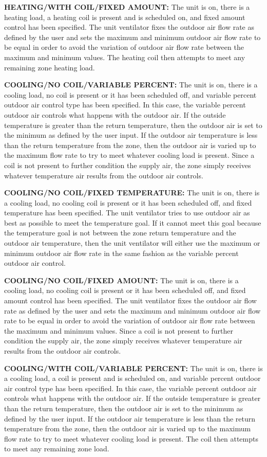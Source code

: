 \textbf{HEATING/WITH COIL/FIXED AMOUNT:} The unit is on, there is a heating load, a heating coil is present and is scheduled on, and fixed amount control has been specified. The unit ventilator fixes the outdoor air flow rate as defined by the user and sets the maximum and minimum outdoor air flow rate to be equal in order to avoid the variation of outdoor air flow rate between the maximum and minimum values. The heating coil then attempts to meet any remaining zone heating load.

\textbf{COOLING/NO COIL/VARIABLE PERCENT:} The unit is on, there is a cooling load, no coil is present or it has been scheduled off, and variable percent outdoor air control type has been specified. In this case, the variable percent outdoor air controls what happens with the outdoor air. If the outside temperature is greater than the return temperature, then the outdoor air is set to the minimum as defined by the user input. If the outdoor air temperature is less than the return temperature from the zone, then the outdoor air is varied up to the maximum flow rate to try to meet whatever cooling load is present. Since a coil is not present to further condition the supply air, the zone simply receives whatever temperature air results from the outdoor air controls.

\textbf{COOLING/NO COIL/FIXED TEMPERATURE:} The unit is on, there is a cooling load, no cooling coil is present or it has been scheduled off, and fixed temperature has been specified. The unit ventilator tries to use outdoor air as best as possible to meet the temperature goal. If it cannot meet this goal because the temperature goal is not between the zone return temperature and the outdoor air temperature, then the unit ventilator will either use the maximum or minimum outdoor air flow rate in the same fashion as the variable percent outdoor air control.

\textbf{COOLING/NO COIL/FIXED AMOUNT:} The unit is on, there is a cooling load, no cooling coil is present or it has been scheduled off, and fixed amount control has been specified. The unit ventilator fixes the outdoor air flow rate as defined by the user and sets the maximum and minimum outdoor air flow rate to be equal in order to avoid the variation of outdoor air flow rate between the maximum and minimum values. Since a coil is not present to further condition the supply air, the zone simply receives whatever temperature air results from the outdoor air controls.

\textbf{COOLING/WITH COIL/VARIABLE PERCENT:} The unit is on, there is a cooling load, a coil is present and is scheduled on, and variable percent outdoor air control type has been specified. In this case, the variable percent outdoor air controls what happens with the outdoor air. If the outside temperature is greater than the return temperature, then the outdoor air is set to the minimum as defined by the user input. If the outdoor air temperature is less than the return temperature from the zone, then the outdoor air is varied up to the maximum flow rate to try to meet whatever cooling load is present. The coil then attempts to meet any remaining zone load.

